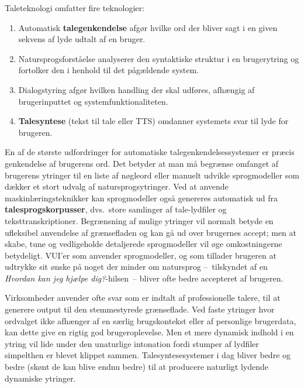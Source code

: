 \begin{multicols}{2}
Taleteknologi omfatter fire teknologier:

\begin{enumerate}
  \item Automatisk {\bf talegenkendelse} afg\o r hvilke ord der bliver sagt i en given sekvens af lyde udtalt af en bruger.
      \item Natursprogsforst\aa else analyserer den syntaktiske struktur i en brugerytring og fortolker den i henhold til det p\aa g\ae ldende system.
      \item  Dialogstyring afg\o r hvilken handling der skal udf\o res, afh\ae ngig af brugerinputtet og systemfunktionaliteten.
      \item {\bf Talesyntese} (tekst til tale eller TTS) omdanner sy\-stemets svar til lyde for brugeren.
\end{enumerate}

  En af de st\o rste udfordringer for automatiske talegen\-kendelsessystemer er pr\ae cis genkendelse af brugerens ord. Det betyder at man \mbox{m\aa} begr\ae nse omfanget af brugerens ytringer til en liste af n\o gleord eller manuelt udvikle sprogmodeller som d\ae kker et stort udvalg af natursprogsytringer. Ved at anvende maskinl\ae rings\-teknikker kan sprogmodeller \mbox{ogs\aa} genereres automatisk ud fra {\bf talesprogskorpusser}, dvs.\ store samlinger af tale-lydfiler og teksttranskriptioner. Begr\ae nsning af mulige ytringer vil normalt betyde en ufleksibel anvendelse af gr\ae nsefladen og kan \mbox{g\aa} ud over brugernes accept; men at skabe, tune og vedligeholde detaljerede sprogmodeller vil \o ge omkostningerne betydeligt. VUI'er som anvender sprogmodeller, og som tillader brugeren at udtrykke sit \o nske \mbox{p\aa} noget der minder om natursprog --~tilskyndet af en {\it Hvordan kan jeg hj\ae lpe dig?}-hilsen~-- bliver ofte bedre accepteret af brugeren.


Virksomheder anvender ofte svar som er indtalt af professionelle talere, til at generere output til den stemmestyrede gr\ae nseflade. Ved faste ytringer hvor ordvalget ikke afh\ae nger af en s\ae rlig brugskontekst eller af personlige brugerdata, kan dette give en rigtig god brugeroplevelse. Men et mere dynamisk indhold i en ytring vil lide under den unaturlige intonation fordi stumper af lydfiler simpelthen er blevet klippet sammen. Talesyntesesystemer i dag bliver bedre og bedre (sk\o nt de kan blive endnu bedre) til at producere naturligt lydende dynamiske ytringer.


\end{multicols}
